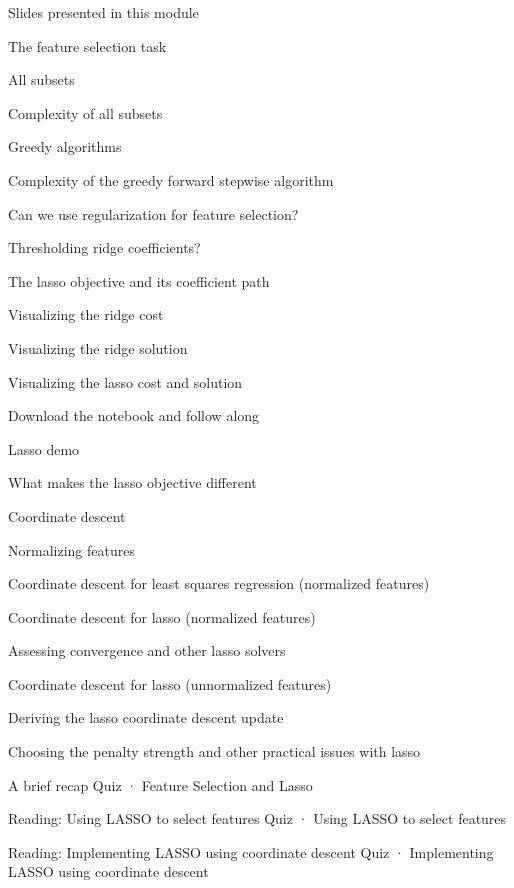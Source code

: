 \item Slides presented in this module
\item The feature selection task
\item All subsets
\item Complexity of all subsets
\item Greedy algorithms
\item Complexity of the greedy forward stepwise algorithm
\item Can we use regularization for feature selection?
\item Thresholding ridge coefficients?
\item The lasso objective and its coefficient path
\item Visualizing the ridge cost
\item Visualizing the ridge solution
\item Visualizing the lasso cost and solution
\item Download the notebook and follow along
\item Lasso demo
\item What makes the lasso objective different
\item Coordinate descent
\item Normalizing features
\item Coordinate descent for least squares regression (normalized features)
\item Coordinate descent for lasso (normalized features)
\item Assessing convergence and other lasso solvers
\item Coordinate descent for lasso (unnormalized features)
\item Deriving the lasso coordinate descent update
\item Choosing the penalty strength and other practical issues with lasso
\item A brief recap
Quiz · Feature Selection and Lasso
\item Reading: Using LASSO to select features
Quiz · Using LASSO to select features
\item Reading: Implementing LASSO using coordinate descent
Quiz · Implementing LASSO using coordinate descent

